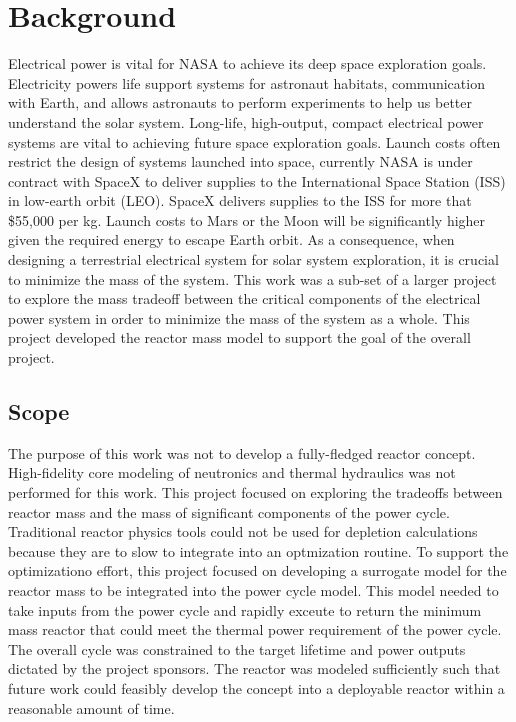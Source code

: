 \section{Background}
Electrical power is vital for NASA to achieve its deep space exploration goals.
Electricity powers life support systems for astronaut habitats, communication
with Earth, and allows astronauts to perform experiments to help us better
understand the solar system. Long-life, high-output, compact electrical power
systems are vital to achieving future space exploration goals. Launch costs 
often restrict the design of systems launched
into space, currently NASA is under contract with SpaceX to deliver supplies to
the International Space Station (ISS) in low-earth orbit (LEO). SpaceX delivers
supplies to the ISS for more that \$55,000 per kg. Launch costs to Mars or the
Moon will be significantly higher given the required energy to escape Earth
orbit. As a consequence, when designing a terrestrial electrical system for
solar system exploration, it is crucial to minimize the mass of the system. This
work was a sub-set of a larger
project to explore the mass tradeoff between the critical components of the
electrical power system in order to minimize the mass of the system as a whole.
This project developed the reactor mass model to support the goal of the overall
project.

\subsection{Scope}
The purpose of this work was not to develop a fully-fledged reactor concept.
High-fidelity core modeling of neutronics and thermal hydraulics was not
performed for this work.
This project focused on exploring the tradeoffs between reactor mass and the
mass of significant components of the power cycle. Traditional reactor physics
tools could not be used for depletion calculations because they are to slow to
integrate into an optmization routine. To support the optimizationo effort, this project focused on
developing a surrogate model for the reactor mass to be integrated into the
power cycle model. This model needed to take inputs from the power cycle and
rapidly exceute to return the minimum mass reactor that could meet the thermal
power requirement of the power cycle. The overall cycle was constrained to the
target lifetime and power outputs dictated by the project sponsors. The reactor
was modeled sufficiently such that future work could feasibly develop the
concept into a deployable reactor within a reasonable amount of time.

